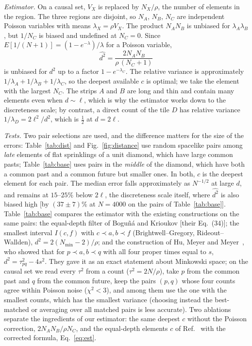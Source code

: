\documentclass[prd,twocolumn,superscriptaddress,nofootinbib,amsmath,amssymb,floatfix]{revtex4-2}
\begin{document}
\emph{Estimator.} On a causal set, $V_X$ is replaced by $N_X/\rho$, the number of elements in the region. The three regions are disjoint, so $N_A$, $N_B$, $N_C$ are independent Poisson variables with means $\lambda_X=\rho V_X$. The product $N_AN_B$ is unbiased for $\lambda_A\lambda_B$, but $1/N_C$ is biased and undefined at $N_C=0$. Since $E[1/(N+1)]=(1-e^{-\lambda})/\lambda$ for a Poisson variable,
\begin{equation}
\widehat{d^2}=\frac{2N_AN_B}{\rho\,(N_C+1)}
\label{eq:est}
\end{equation}
is unbiased for $d^2$ up to a factor $1-e^{-\lambda_C}$. The relative variance is approximately $1/\lambda_A+1/\lambda_B+1/\lambda_C$, so the deepest available $c$ is optimal; we take the element with the largest $N_C$. The strips $A$ and $B$ are long and thin and contain many elements even when $d\sim\ell$, which is why the estimator works down to the discreteness scale; by contrast, a direct count of the tile $D$ has relative variance $1/\lambda_D=2\ell^2/d^2$, which is $\tfrac12$ at $d=2\ell$.

\emph{Tests.} Two pair selections are used, and the difference matters for the size of the errors: Table~\ref{tab:dist} and Fig.~\ref{fig:distance} use random spacelike pairs among \emph{late} elements of flat sprinklings of a unit diamond, which have large common pasts; Table~\ref{tab:base} uses pairs in the \emph{middle} of the diamond, which have both a common past and a common future but smaller ones. In both, $c$ is the deepest element for each pair. The median error falls approximately as $N^{-1/2}$ at large $d$, and remains at $15$--$25\%$ below $2\ell$, the discreteness scale itself, where $\widehat{d^2}$ is also biased high [by $(37\pm7)\%$ at $N=4000$ on the pairs of Table~\ref{tab:base}]. Table~\ref{tab:base} compares the estimator with the existing constructions on the same pairs: the equal-depth filter of Bogu\~n\'a and Krioukov [their Eq.~(34)]; the smallest interval $I(c,f)$ with $c\prec a,b\prec f$ (Brightwell--Gregory, Rideout--Wallden), $d^2=2(N_{\min}-2)/\rho$; and the construction of Hu, Meyer and Meyer~\cite{HMM25}, who showed that for $p\prec a,b\prec q$ with all four proper times equal to $s$, $d^2=\tau_{pq}^2-4s^2$. They gave it as an exact statement about Minkowski space; on the causal set we read every $\tau^2$ from a count ($\tau^2=2N/\rho$), take $p$ from the common past and $q$ from the common future, keep the pairs $(p,q)$ whose four counts agree within Poisson noise ($\chi^2<3$), and among them use the one with the smallest counts, which has the smallest variance (choosing instead the best-matched or averaging over all matched pairs is less accurate). Two ablations separate the ingredients of our estimator: the same deepest $c$ without the Poisson correction, $2N_AN_B/\rho N_C$, and the equal-depth elements $c$ of Ref.~\cite{BK24} with the corrected formula, Eq.~\eqref{eq:est}.
\end{document}
